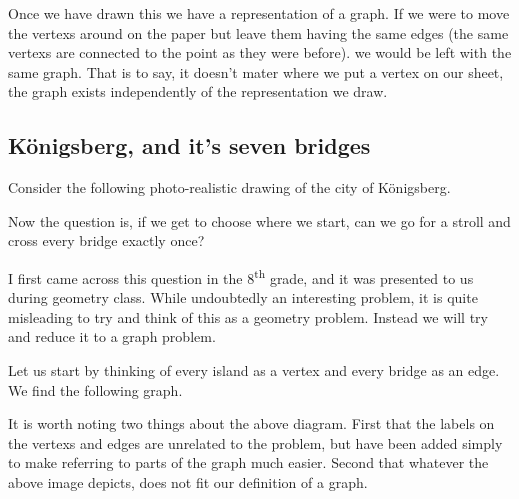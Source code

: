 \documentclass{article}
\begin{document}
Once we have drawn this we have a representation of a graph. If we were to move the \glspl{vertex} around on the paper but leave them having the same \glspl{edge} (the same \glspl{vertex} are connected to the point as they were before). we would be left with the same graph. That is to say, it doesn't mater where we put a \gls{vertex} on our sheet, the graph exists independently of the representation we draw.

\subsection{K\"onigsberg, and it's seven bridges}

Consider the following photo-realistic drawing of the city of K\"onigsberg.



Now the question is, if we get to choose where we start, can we go for a stroll and cross every bridge exactly once?

I first came across this question in the 8\textsuperscript{th} grade, and it was presented to us during geometry class. While undoubtedly an interesting problem, it is quite misleading to try and think of this as a geometry problem. Instead we will try and reduce it to a graph problem.

Let us start by thinking of every island as a \gls{vertex} and every bridge as an \gls{edge}. We find the following graph.

\begin{center}
\end{center}

It is worth noting two things about the above diagram. First that the labels on the \glspl{vertex} and \glspl{edge} are unrelated to the problem, but have been added simply to make referring to parts of the graph much easier. Second that whatever the above image depicts, does not fit our definition of a graph. %
\end{document}
